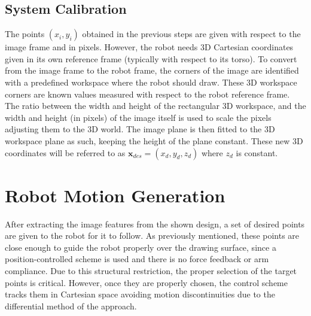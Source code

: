 \documentclass[conference]{IEEEtran}
\newcommand{\x}{\mathbf x}
\begin{document}

\subsection{System Calibration}

The points $(x_i,y_i)$ obtained in the previous steps are given with respect to the image frame and in pixels. However, the robot needs 3D Cartesian coordinates given in its own reference frame (typically with respect to its torso). To convert from the image frame to the robot frame, the corners of the image are identified with a predefined workspace where the robot should draw. These 3D workspace corners are known values measured with respect to the robot reference frame. The ratio between the width and height of the rectangular 3D workspace, and the width and height (in pixels) of the image itself is used to scale the pixels adjusting them to the 3D world. The image plane is then fitted to the 3D workspace plane as such, keeping the height of the plane constant. These new 3D coordinates will be referred to as $\x_{des} = (x_d, y_d, z_d)$ where $z_d$ is constant.

\section{Robot Motion Generation}

After extracting the image features from the shown design, a set of desired points are given to the robot for it to follow. As previously mentioned, these points are close enough to guide the robot properly over the drawing surface, since a position-controlled scheme is used and there is no force feedback or arm compliance. Due to this structural restriction, the proper selection of the target points is critical. However, once they are properly chosen, the control scheme tracks them in Cartesian space avoiding motion discontinuities due to the differential method of the approach.
\end{document}
